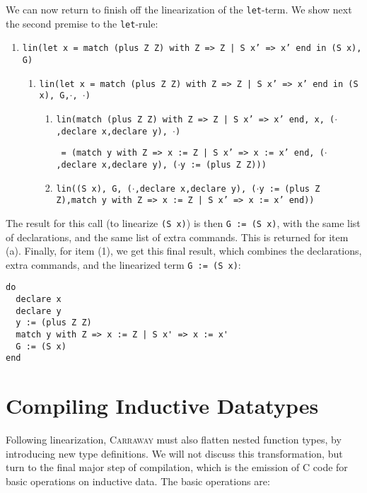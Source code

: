 \documentclass{book}[12pt]
\newcommand{\carraway}[0]{\textsc{Carraway}\xspace}
\begin{document}
We can now return to finish off the linearization of the
\texttt{let}-term.  We show next the second premise to the
\texttt{let}-rule:

{\small
\begin{enumerate}
\item \texttt{lin(let x = match (plus Z Z) with Z => Z | S x' => x' end in (S x), G)}
\begin{enumerate}
\item \texttt{lin(let x = match (plus Z Z) with Z => Z | S x' => x' end in (S x), G,}$\cdot$\texttt{, }$\cdot$\texttt{)}
\begin{enumerate}
\item \texttt{lin(match (plus Z Z) with Z => Z | S x' => x' end, x, (}$\cdot$\texttt{,declare x,declare y), }$\cdot$\texttt{)}

\texttt{ = (match y with Z => x := Z | S x' => x := x' end, (}$\cdot$\texttt{,declare x,declare y), (}$\cdot$\texttt{y := (plus Z Z)))}
\item \texttt{lin((S x), G, (}$\cdot$\texttt{,declare x,declare y), (}$\cdot$\texttt{y := (plus Z Z),match y with Z => x := Z | S x' => x := x' end))}
\end{enumerate}
\end{enumerate}
\end{enumerate}
}

\noindent The result for this call (to linearize \texttt{(S x)}) is
then \texttt{G := (S x)}, with the same list of declarations, and the
same list of extra commands.  This is returned for item (a).  Finally,
for item (1), we get this final result, which combines the
declarations, extra commands, and the linearized term \texttt{G := (S
x)}:

\begin{verbatim}
do 
  declare x
  declare y
  y := (plus Z Z)
  match y with Z => x := Z | S x' => x := x'
  G := (S x)
end
\end{verbatim}

\section{Compiling Inductive Datatypes}
\label{ch10:ind}

Following linearization, \carraway must also flatten nested function
types, by introducing new type definitions.  We will not discuss this
transformation, but turn to the final major step of compilation, which
is the emission of C code for basic operations on inductive data.
The basic operations are:
\end{document}
